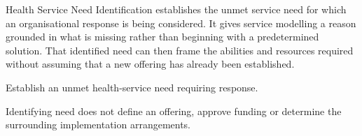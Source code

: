 Health Service Need Identification establishes the unmet service need for which an organisational response is being considered. It gives service modelling a reason grounded in what is missing rather than beginning with a predetermined solution. That identified need can then frame the abilities and resources required without assuming that a new offering has already been established.



Establish an unmet health-service need requiring response.



Identifying need does not define an offering, approve funding or determine the surrounding implementation arrangements.


